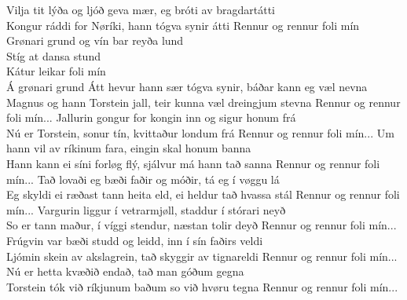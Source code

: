 \begin{flushleft}
Vilja tit lýða og ljóð geva mær, eg bróti av bragdartátti \\
Kongur ráddi for Nøríki, hann tógva synir átti 
\hops
\hspace{0.9cm}Rennur og rennur foli mín \\
\hspace{0.9cm}Grønari grund og vín bar reyða lund \\
\hspace{0.9cm}Stíg at dansa stund \tab{}\\
\hspace{0.9cm}Kátur leikar foli mín \tab{}\\
\hspace{0.9cm}Á grønari grund \tab{}
\hops
Átt hevur hann sær tógva synir, báðar kann eg væl nevna\\
Magnus og hann Torstein jall, teir kunna væl
dreingjum stevna
\hops
\hspace{0.9cm}Rennur og rennur foli mín...
\hops
Jallurin gongur for kongin inn og sigur honum frá\\
Nú er Torstein, sonur tín, kvittaður londum frá
\hops
\hspace{0.9cm}Rennur og rennur foli mín...
\hops
Um hann vil av ríkinum fara, eingin skal honum banna\\
Hann kann ei síni forløg flý, sjálvur má hann tað sanna
\hops
\hspace{0.9cm}Rennur og rennur foli mín...
\hops
Tað lovaði eg bæði faðir og móðir, tá eg í vøggu lá\\
Eg skyldi ei ræðast tann heita eld, ei heldur tað hvassa stál
\hops
\hspace{0.9cm}Rennur og rennur foli mín...
\hops
Vargurin liggur í vetrarmjøll, staddur í stórari neyð\\
So er tann maður, í víggi stendur, næstan tolir deyð
\hops
\hspace{0.9cm}Rennur og rennur foli mín...
\hops
Frúgvin var bæði studd og leidd, inn í sín faðirs veldi\\
Ljómin skein av akslagrein, tað skyggir av tignareldi
\hops
\hspace{0.9cm}Rennur og rennur foli mín...
\hops
Nú er hetta kvæðið endað, tað man góðum gegna\\
Torstein tók við ríkjunum baðum so við hvøru tegna
\hops
\hspace{0.9cm}Rennur og rennur foli mín...
\hops
\end{flushleft}

